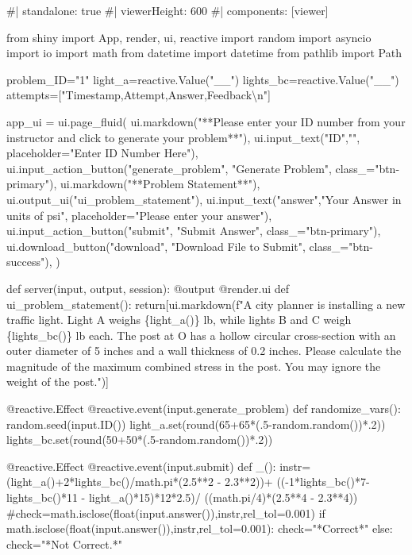 \documentclass[
  letterpaper,
  DIV=11,
  numbers=noendperiod]{scrreprt}
\newenvironment{Shaded}{\begin{snugshade}}{\end{snugshade}}
\newcommand{\NormalTok}[1]{\textcolor[rgb]{0.00,0.23,0.31}{#1}}
\begin{document}
\begin{Shaded}
\begin{Highlighting}[]
\NormalTok{\#| standalone: true}
\NormalTok{\#| viewerHeight: 600}
\NormalTok{\#| components: [viewer]}

\NormalTok{from shiny import App, render, ui, reactive}
\NormalTok{import random}
\NormalTok{import asyncio}
\NormalTok{import io}
\NormalTok{import math}
\NormalTok{from datetime import datetime}
\NormalTok{from pathlib import Path}

\NormalTok{problem\_ID="1"}
\NormalTok{light\_a=reactive.Value("\_\_")}
\NormalTok{lights\_bc=reactive.Value("\_\_")}
\NormalTok{attempts=["Timestamp,Attempt,Answer,Feedback\textbackslash{}n"]}

\NormalTok{app\_ui = ui.page\_fluid(}
\NormalTok{    ui.markdown("**Please enter your ID number from your instructor and click to generate your problem**"),}
\NormalTok{    ui.input\_text("ID","", placeholder="Enter ID Number Here"),}
\NormalTok{    ui.input\_action\_button("generate\_problem", "Generate Problem", class\_="btn{-}primary"),}
\NormalTok{    ui.markdown("**Problem Statement**"),}
\NormalTok{    ui.output\_ui("ui\_problem\_statement"),}
\NormalTok{    ui.input\_text("answer","Your Answer in units of psi", placeholder="Please enter your answer"),}
\NormalTok{    ui.input\_action\_button("submit", "Submit Answer", class\_="btn{-}primary"),}
\NormalTok{    ui.download\_button("download", "Download File to Submit", class\_="btn{-}success"),}
\NormalTok{)}


\NormalTok{def server(input, output, session):}
\NormalTok{    @output}
\NormalTok{    @render.ui}
\NormalTok{    def ui\_problem\_statement():}
\NormalTok{        return[ui.markdown(f"A city planner is installing a new traffic light. Light A weighs \{light\_a()\} lb, while lights B and C weigh \{lights\_bc()\} lb each. The post at O has a hollow circular cross{-}section with an outer diameter of 5 inches and a wall thickness of 0.2 inches. Please calculate the magnitude of the maximum combined stress in the post. You may ignore the weight of the post.")]}
    
\NormalTok{    @reactive.Effect}
\NormalTok{    @reactive.event(input.generate\_problem)}
\NormalTok{    def randomize\_vars():}
\NormalTok{        random.seed(input.ID())}
\NormalTok{        light\_a.set(round(65+65*(.5{-}random.random())*.2))}
\NormalTok{        lights\_bc.set(round(50+50*(.5{-}random.random())*.2))}

\NormalTok{    @reactive.Effect}
\NormalTok{    @reactive.event(input.submit)}
\NormalTok{    def \_():}
\NormalTok{        instr= (light\_a()+2*lights\_bc()/math.pi*(2.5**2 {-} 2.3**2))+ (({-}1*lights\_bc()*7{-} lights\_bc()*11 {-} light\_a()*15)*12*2.5)/ ((math.pi/4)*(2.5**4 {-} 2.3**4))}
\NormalTok{        \#check=math.isclose(float(input.answer()),instr,rel\_tol=0.001)}
\NormalTok{        if math.isclose(float(input.answer()),instr,rel\_tol=0.001):}
\NormalTok{           check="*Correct*"}
\NormalTok{        else:}
\NormalTok{           check="*Not Correct.*"}
        

\end{Highlighting}
\end{Shaded}
\end{document}
